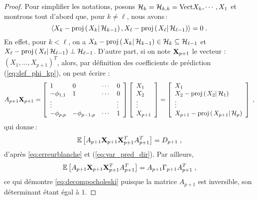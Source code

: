 \begin{proof}\smartqed
Pour simplifier les notations, posons $\mathcal{H}_k =\mathcal{H}_{k,k}= \mathrm{Vect}{X_k, \cdots, X_1}$ et montrons tout
d'abord que, pour $k \neq \ell$, nous avons\,:
\begin{equation}
 \label{eq:erreurblanche}
 \pscal{X_k - \proj{X_k}{\cH_{k-1}}}{X_{\ell} - \proj{X_{\ell}}{\cH_{{\ell}-1}}} = 0 \eqsp.
\end{equation}
En effet, pour $k < \ell$, on a $X_{k} - \proj{X_{k}}{\cH_{k-1}} \in
\cH_k\subseteq\cH_{\ell-1}$ et $X_{\ell} -
\proj{X_{\ell}}{\cH_{\ell-1}} \perp \cH_{\ell-1}$.
D'autre part, si on note ${\bf X}_{p+1}$ le vecteur :
$(X_1,\dots,X_{p+1})^T$, alors,
par d\'efinition des coefficients de pr\'ediction (\ref{eq:def_phi_kp}), on peut \'ecrire :
\[
A_{p+1} {\bf X}_{p+1} = \left[
\begin{array}{llll}
1            & 0             & \cdots & 0 \\
- \phi_{1,1} & 1             & \cdots & 0 \\
\vdots       &               &        & \vdots \\
- \phi_{p,p} & - \phi_{p-1,p}& \cdots & 1
\end{array}
\right] \left[
\begin{array}{l}
X_{1} \\
X_{2} \\
\vdots \\
X_{p+1}
\end{array}
\right] = \left [
\begin{array}{l}
X_1 \\
X_2 - \proj{X_2}{\cH_1} \\
\vdots \\
X_{p+1} - \proj{X_{p+1}}{\cH_{p}}
\end{array}
\right ]\;,
\]
qui donne\,:
$$
 {\mathbb E}\left[ A_{p+1} {\bf X}_{p+1} {\bf X}_{p+1}^T A_{p+1}^T \right]
 =D_{p+1}\;,
$$
d'apr\`es \eqref{eq:erreurblanche} et (\ref{eq:var_pred_dir}).
Par ailleurs,
$$
{\mathbb E}\left[ A_{p+1} {\bf X}_{p+1} {\bf X}_{p+1}^T A_{p+1}^T \right]
= A_{p+1} \Gamma_{p+1}A_{p+1}^T\;,
$$
ce qui d\'emontre \eqref{eq:decompocholeski} puisque la
matrice $A_{p+1}$ est inversible, son d\'eterminant \'etant \'egal \`a
$1$.

\end{proof}
